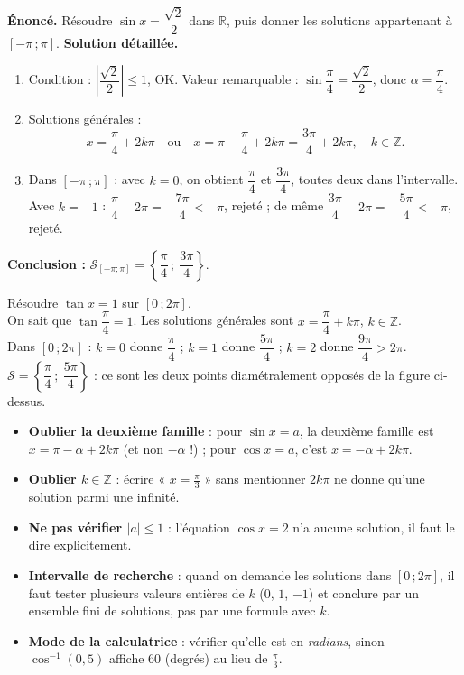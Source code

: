 \documentclass[11pt]{article}
\begin{document}
\begin{exoresolu}[{Résoudre $\sin x = \dfrac{\sqrt{2}}{2}$ sur $[-\pi\,;\pi]$}]
\textbf{Énoncé.} Résoudre $\sin x = \dfrac{\sqrt{2}}{2}$ dans $\mathbb{R}$, puis donner les solutions appartenant à $[-\pi\,;\pi]$.
\tcblower
\textbf{Solution détaillée.}
\begin{enumerate}
\item Condition : $\left|\dfrac{\sqrt{2}}{2}\right| \le 1$, OK. Valeur remarquable : $\sin \dfrac{\pi}{4} = \dfrac{\sqrt{2}}{2}$, donc $\alpha = \dfrac{\pi}{4}$.
\item Solutions générales :
\[ x = \frac{\pi}{4} + 2k\pi \quad \text{ou} \quad x = \pi - \frac{\pi}{4} + 2k\pi = \frac{3\pi}{4} + 2k\pi, \quad k \in \mathbb{Z}. \]
\item Dans $[-\pi\,;\pi]$ : avec $k = 0$, on obtient $\dfrac{\pi}{4}$ et $\dfrac{3\pi}{4}$, toutes deux dans l'intervalle. Avec $k = -1$ : $\dfrac{\pi}{4} - 2\pi = -\dfrac{7\pi}{4} < -\pi$, rejeté ; de même $\dfrac{3\pi}{4} - 2\pi = -\dfrac{5\pi}{4} < -\pi$, rejeté.
\end{enumerate}
\textbf{Conclusion :} $\mathcal{S}_{[-\pi;\pi]} = \left\{\dfrac{\pi}{4}\,;\ \dfrac{3\pi}{4}\right\}$.
\end{exoresolu}

\begin{exemplebox}
Résoudre $\tan x = 1$ sur $[0\,;2\pi]$. \\
On sait que $\tan \dfrac{\pi}{4} = 1$. Les solutions générales sont $x = \dfrac{\pi}{4} + k\pi$, $k \in \mathbb{Z}$. \\
Dans $[0\,;2\pi]$ : $k = 0$ donne $\dfrac{\pi}{4}$ ; $k = 1$ donne $\dfrac{5\pi}{4}$ ; $k = 2$ donne $\dfrac{9\pi}{4} > 2\pi$. \\
$\mathcal{S} = \left\{\dfrac{\pi}{4}\,;\ \dfrac{5\pi}{4}\right\}$ : ce sont les deux points diamétralement opposés de la figure ci-dessus.
\end{exemplebox}

\begin{attention}
\begin{itemize}
\item \textbf{Oublier la deuxième famille} : pour $\sin x = a$, la deuxième famille est $x = \pi - \alpha + 2k\pi$ (et non $-\alpha$ !) ; pour $\cos x = a$, c'est $x = -\alpha + 2k\pi$.
\item \textbf{Oublier $k \in \mathbb{Z}$} : écrire « $x = \frac{\pi}{3}$ » sans mentionner $2k\pi$ ne donne qu'une solution parmi une infinité.
\item \textbf{Ne pas vérifier $|a| \le 1$} : l'équation $\cos x = 2$ n'a aucune solution, il faut le dire explicitement.
\item \textbf{Intervalle de recherche} : quand on demande les solutions dans $[0\,;2\pi]$, il faut tester plusieurs valeurs entières de $k$ ($0$, $1$, $-1$) et conclure par un ensemble fini de solutions, pas par une formule avec $k$.
\item \textbf{Mode de la calculatrice} : vérifier qu'elle est en \emph{radians}, sinon $\cos^{-1}(0{,}5)$ affiche $60$ (degrés) au lieu de $\frac{\pi}{3}$.
\end{itemize}
\end{attention}
\end{document}
